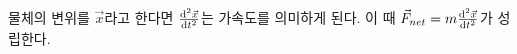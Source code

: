 \documentclass{oblivoir}
\begin{document}
	물체의 변위를 $\vec{x}$라고 한다면 
	$\dv[2]{\vec{x}}{t}$는 가속도를 의미하게 된다. 
	이 때 $\vec{F}_{net}=m\dv[2]{\vec{x}}{t}$가 
	성립한다.
\end{document}

